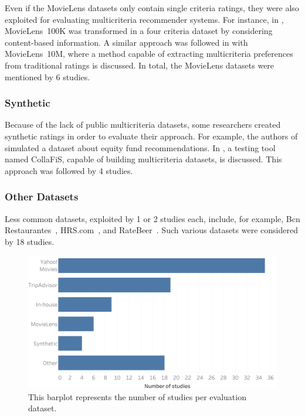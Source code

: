 Even if the MovieLens datasets only contain single criteria ratings, they were also exploited for evaluating multicriteria recommender systems. For instance, in , MovieLens~100K was transformed in a four criteria dataset by considering content-based information. A similar approach was followed in  with MovieLens~10M, where a method capable of extracting multicriteria preferences from traditional ratings is discussed. In total, the MovieLens datasets were mentioned by 6 studies.

\subsubsection{Synthetic}

Because of the lack of public multicriteria datasets, some researchers created synthetic ratings in order to evaluate their approach. For example, the authors of  simulated a dataset about equity fund recommendations. In , a testing tool named CollaFiS, capable of building multicriteria datasets, is discussed. This approach was followed by 4 studies.

\subsubsection{Other Datasets}

Less common datasets, exploited by 1 or 2 studies each, include, for example, Bcn Restaurantes~, HRS.com~, and RateBeer~. Such various datasets were considered by 18 studies.

\begin{figure}
\centering
\includegraphics[width=\textwidth]{dataset_per_study}
\caption[Studies per evaluation dataset]{This barplot represents the number of studies per evaluation dataset.}
\label{mcr:fig:dataset-per-study}
\end{figure}

